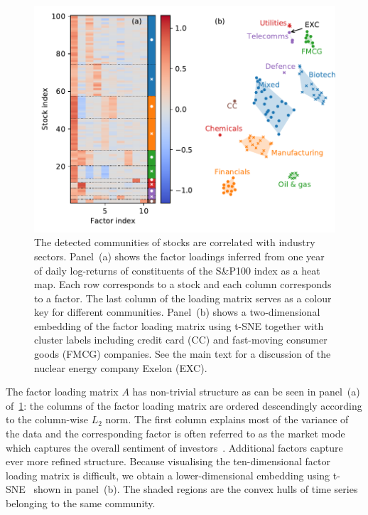 \documentclass[onecolumn,pre,superscriptaddress, longbibliography, nofootinbib, notitlepage]{revtex4-1}
\begin{document}
\begin{figure}
    \includegraphics{sp100-factor-loadings.pdf}
    \caption{\label{fig:sp100-factor-loadings} The detected communities of stocks are correlated with industry sectors. Panel~(a) shows the factor loadings inferred from one year of daily log-returns of constituents of the S\&P100 index as a heat map. Each row corresponds to a stock and each column corresponds to a factor. The last column of the loading matrix serves as a colour key for different communities. Panel~(b) shows a two-dimensional embedding of the factor loading matrix using t-SNE together with cluster labels including credit card (CC) and fast-moving consumer goods (FMCG) companies. See the main text for a discussion of the nuclear energy company Exelon (EXC).} 
\end{figure}

The factor loading matrix $A$ has non-trivial structure as can be seen in panel~(a) of~\cref{fig:sp100-factor-loadings}: the columns of the factor loading matrix are ordered descendingly according to the column-wise $L_2$ norm. The first column explains most of the variance of the data and the corresponding factor is often referred to as the market mode which captures the overall sentiment of investors~\cite{Fenn2011, MacMahon2015}. Additional factors capture ever more refined structure. Because visualising the ten-dimensional factor loading matrix is difficult, we obtain a lower-dimensional embedding using t-SNE~\cite{Maaten2008} shown in panel~(b). The shaded regions are the convex hulls of time series belonging to the same community.
\end{document}
